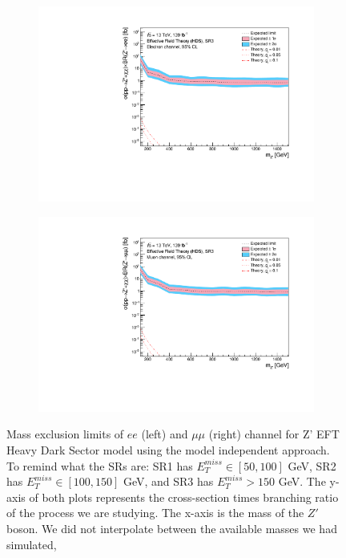 \documentclass[12pt, a4paper]{book}
\begin{document}
\begin{figure}[!ht]
\begin{subfigure}[b]{0.49\textwidth}
      \includegraphics[width=1\textwidth]{Limits/Model_independent/150/EFT_HDS/mass_exclusion_ee.pdf}
   \end{subfigure}
   \hfill
   \begin{subfigure}[b]{0.49\textwidth}
      \centering
      \includegraphics[width=1\textwidth]{Limits/Model_independent/150/EFT_HDS/mass_exclusion_uu.pdf}
   \end{subfigure}
   \caption[Expected mass exclusion limits results for EFT HDS model on $ee$ and $\mu\mu$ channel using the model independent approach]{Mass exclusion limits of $ee$ (left) and $\mu\mu$ (right) channel for Z' EFT Heavy Dark Sector model using the model independent approach. To remind what the SRs are: SR1 has $E_T^{miss}\in[50, 100]$ GeV, SR2 has $E_T^{miss}\in[100, 150]$ GeV, and SR3 has $E_T^{miss}>150$ GeV. The y-axis of both plots represents the cross-section times branching ratio of the process we are studying. The x-axis is the mass of the $Z'$ boson. We did not interpolate between the available masses we had simulated, 
}
\end{figure}
\end{document}
